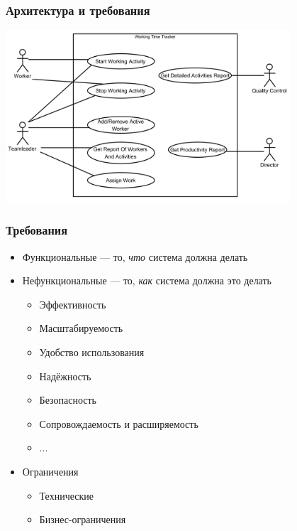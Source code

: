 \documentclass[xetex,mathserif,serif]{beamer}
\begin{document}
	\begin{frame}
		\frametitle{Архитектура и требования}
		\begin{center}
			\includegraphics[width=0.8\textwidth]{useCaseDiagram.png}
		\end{center}
	\end{frame}

	\begin{frame}
		\frametitle{Требования}
		\begin{itemize}
			\item Функциональные --- то, \emph{что} система должна делать
			\item Нефункциональные --- то, \emph{как} система должна это делать
			\begin{itemize}
				\item Эффективность
				\item Масштабируемость
				\item Удобство использования
				\item Надёжность
				\item Безопасность
				\item Сопровождаемость и расширяемость
				\item ...
			\end{itemize}
			\item Ограничения
			\begin{itemize}
				\item Технические
				\item Бизнес-ограничения
			\end{itemize}
		\end{itemize}
	\end{frame}
\end{document}
